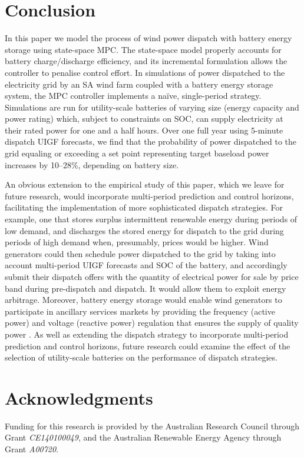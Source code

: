 \documentclass[conference]{IEEEtran}
\begin{document}
\section{Conclusion}\label{sect:conclusion}
In this paper we model the process of wind power dispatch with battery energy storage using state-space MPC.  The state-space model properly accounts for battery charge/discharge efficiency, and its incremental formulation allows the controller to penalise control effort.  In simulations of power dispatched to the electricity grid by an SA wind farm coupled with a battery energy storage system, the MPC controller implements a na\"ive, single-period strategy.  Simulations are run for utility-scale batteries of varying size (energy capacity and power rating) which, subject to constraints on SOC, can supply electricity at their rated power for one and a half hours.  Over one full year using 5-minute dispatch UIGF forecasts, we find that the probability of power dispatched to the grid equaling or exceeding a set point representing target baseload power increases by 10--28\%, depending on battery size.

An obvious extension to the empirical study of this paper, which we leave for future research, would incorporate multi-period prediction and control horizons, facilitating the implementation of more sophisticated dispatch strategies.  For example, one that stores surplus intermittent renewable energy during periods of low demand, and discharges the stored energy for dispatch to the grid during periods of high demand when, presumably, prices would be higher.  Wind generators could then schedule power dispatched to the grid by taking into account multi-period UIGF forecasts and SOC of the battery, and accordingly submit their dispatch offers with the quantity of electrical power for sale by price band during pre-dispatch and dispatch.  It would allow them to exploit energy arbitrage.  Moreover, battery energy storage would enable wind generators to participate in ancillary services markets by providing the frequency (active power) and voltage (reactive power) regulation that ensures the supply of quality power \citep{ABLFJD12}.  As well as extending the dispatch strategy to incorporate multi-period prediction and control horizons, future research could examine the effect of the selection of utility-scale batteries on the performance of dispatch strategies.

\section*{Acknowledgments}
Funding for this research is provided by the Australian Research Council through Grant \textit{CE140100049}, and the Australian Renewable Energy Agency through Grant \textit{A00720}.



\end{document}
